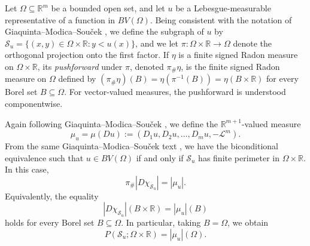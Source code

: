 \documentclass{publicadapt}
\begin{document}
 Let $\Omega\subseteq \mathbb R^m$ be a bounded open set, and let $u$ be a Lebesgue-measurable representative of a function in $ BV(\Omega)$. Being consistent with the notation of 
 Giaquinta--Modica--Sou\v{c}ek \cite[p.\ 371]{GiaquintaModicaSoucek1998}, we define the subgraph of \(u\) by
$
\mathcal S_u
=
\{(x,y)\in\Omega\times\mathbb R:y<u(x)\}$, 
 and we let 
$
\pi:\Omega\times\mathbb R\to\Omega $ 
denote the orthogonal projection onto the first factor.
 If \(\eta\) is a finite signed Radon measure on
\(\Omega\times\mathbb R\), its \emph{pushforward} under \(\pi\), denoted
\(\pi_{\#}\eta\), is the finite signed Radon measure on \(\Omega\) defined by
$
(\pi_{\#}\eta)(B)
=
\eta(\pi^{-1}(B))
=
\eta(B\times\mathbb R)
$
 for every Borel set \(B\subseteq\Omega\). For vector-valued measures, the
 pushforward is understood componentwise.

 Again following Giaquinta--Modica--Sou\v{c}ek \cite[p.\ 371]{GiaquintaModicaSoucek1998}, 
 we define the \(\mathbb R^{m+1}\)-valued measure
\begin{equation}\label{muDu}
\mu_u
=
\mu(Du)
:=
(D_1u, D_2u, \ldots,D_m u,-\mathcal L^m).
\end{equation}
 From the same Giaquinta--Modica--Sou\v{c}ek text \cite[\S4.1.5, Theorem~1]{GiaquintaModicaSoucek1998}, we have the biconditional equivalence
 such that \(u\in BV(\Omega)\)
if and only if \(\mathcal S_u\) has finite perimeter in
\(\Omega\times\mathbb R\). In this case, 
\begin{equation}\label{GMS-pushforward}
\pi_{\#}|D\chi_{\mathcal S_u}|
=
|\mu_u|.
\end{equation}
Equivalently, the equality 
\begin{equation}\label{local-subgraph-perimeter-measure}
|D\chi_{\mathcal S_u}|(B\times\mathbb R)
=
|\mu_u|(B) 
\end{equation}
 holds for every Borel set \(B\subseteq\Omega\). 
 In particular, taking \(B=\Omega\), we obtain
\begin{equation}\label{subgraph-perimeter-vector-measure}
P(\mathcal S_u;\Omega\times\mathbb R)
=
|\mu_u|(\Omega).
\end{equation}
\end{document}
